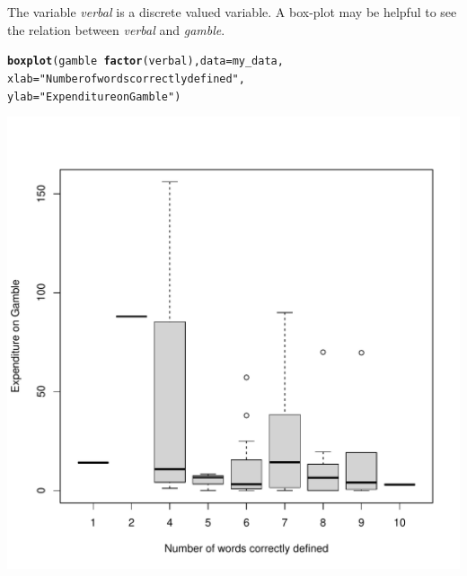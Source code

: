 \documentclass[11pt, a4paper]{article}\usepackage[]{graphicx}\usepackage[]{xcolor}
\makeatletter
\def\maxwidth{ %
  \ifdim\Gin@nat@width>\linewidth
    \linewidth
  \else
    \Gin@nat@width
  \fi
}
\newcommand{\hlstr}[1]{\textcolor[rgb]{0.192,0.494,0.8}{#1}}%
\newcommand{\hlopt}[1]{\textcolor[rgb]{0,0,0}{#1}}%
\newcommand{\hlstd}[1]{\textcolor[rgb]{0.345,0.345,0.345}{#1}}%
\newcommand{\hlkwc}[1]{\textcolor[rgb]{0.333,0.667,0.333}{#1}}%
\newcommand{\hlkwd}[1]{\textcolor[rgb]{0.737,0.353,0.396}{\textbf{#1}}}%
\newenvironment{kframe}{%
 \def\at@end@of@kframe{}%
 \ifinner\ifhmode%
  \def\at@end@of@kframe{\end{minipage}}%
  \begin{minipage}{\columnwidth}%
 \fi\fi%
 \def\FrameCommand##1{\hskip\@totalleftmargin \hskip-\fboxsep
 \colorbox{shadecolor}{##1}\hskip-\fboxsep
     \hskip-\linewidth \hskip-\@totalleftmargin \hskip\columnwidth}%
 \MakeFramed {\advance\hsize-\width
   \@totalleftmargin\z@ \linewidth\hsize
   \@setminipage}}%
 {\par\unskip\endMakeFramed%
 \at@end@of@kframe}
\newenvironment{knitrout}{}{} %
\makeatother
\begin{document}
The variable \textit{verbal} is a discrete valued variable. A box-plot may be helpful to see the relation between \textit{verbal} and \textit{gamble}.
\begin{knitrout}
\color{fgcolor}\begin{kframe}
\begin{alltt}
\hlkwd{boxplot}\hlstd{(gamble} \hlopt{~} \hlkwd{factor}\hlstd{(verbal),} \hlkwc{data} \hlstd{= my_data,}
    \hlkwc{xlab} \hlstd{=} \hlstr{"Number of words correctly defined"}\hlstd{,}
    \hlkwc{ylab} \hlstd{=} \hlstr{"Expenditure on Gamble"}\hlstd{)}
\end{alltt}
\end{kframe}
\includegraphics[width=\maxwidth]{figure/unnamed-chunk-18-1} 
\end{knitrout}

\newpage
\end{document}
